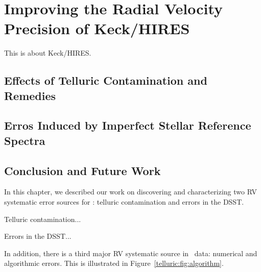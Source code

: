 \chapter{Improving the Radial Velocity Precision of Keck/HIRES}\label{chap:keck}

This is about Keck/HIRES.

\section{Effects of Telluric Contamination and Remedies}\label{keck:sec:telluric}






\section{Erros Induced by Imperfect Stellar Reference Spectra}\label{keck:sec:dsst}





\section{Conclusion and Future Work}\label{keck:sec:conclusion}

In this chapter, we described our work on discovering and
characterizing two RV systematic error sources for \keck: telluric
contamination and errors in the DSST. 

Telluric contamination...

Errors in the DSST...

In addition, there is a third major RV systematic source in \keck\
data: numerical and algorithmic errors. This is illustrated in
Figure~\ref{telluric:fig:algorithm}. 


